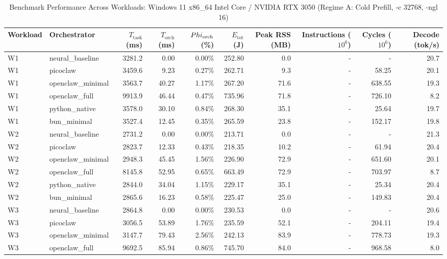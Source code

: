 \begin{table}[t]
\centering\small
\caption{Benchmark Performance Across Workloads: Windows 11 x86_64 Intel Core / NVIDIA RTX 3050 (Regime A: Cold Prefill, -c 32768, -ngl 16)}
\label{tab:Windows_master_summary}
\begin{tabular}{llrrrrrrrr}
\toprule
Workload & Orchestrator & $T_{\text{task}}$ (ms) & $T_{\text{orch}}$ (ms) & $\\Phi_{\text{orch}}$ (\%) & $E_{\text{tot}}$ (J) & Peak RSS (MB) & Instructions ($10^6$) & Cycles ($10^6$) & Decode (tok/s) \\
\midrule
W1 & neural\_baseline & 3281.2 & 0.00 & 0.00\% & 252.80 & 0.0 & - & - & 20.7 \\
W1 & picoclaw & 3459.6 & 9.23 & 0.27\% & 262.71 & 9.3 & - & 58.25 & 20.1 \\
W1 & openclaw\_minimal & 3563.7 & 40.27 & 1.17\% & 267.20 & 71.6 & - & 638.55 & 19.3 \\
W1 & openclaw\_full & 9913.9 & 46.44 & 0.47\% & 735.96 & 71.8 & - & 726.10 & 8.2 \\
W1 & python\_native & 3578.0 & 30.10 & 0.84\% & 268.30 & 35.1 & - & 25.64 & 19.7 \\
W1 & bun\_minimal & 3527.4 & 12.45 & 0.35\% & 265.59 & 23.8 & - & 152.17 & 19.8 \\
\midrule
W2 & neural\_baseline & 2731.2 & 0.00 & 0.00\% & 213.71 & 0.0 & - & - & 21.3 \\
W2 & picoclaw & 2823.7 & 12.33 & 0.43\% & 218.35 & 10.2 & - & 61.94 & 20.4 \\
W2 & openclaw\_minimal & 2948.3 & 45.45 & 1.56\% & 226.90 & 72.9 & - & 651.60 & 20.1 \\
W2 & openclaw\_full & 8145.8 & 52.95 & 0.65\% & 663.49 & 72.9 & - & 703.97 & 8.7 \\
W2 & python\_native & 2844.0 & 34.04 & 1.15\% & 229.17 & 35.1 & - & 25.34 & 20.4 \\
W2 & bun\_minimal & 2865.6 & 16.23 & 0.58\% & 225.47 & 25.0 & - & 149.83 & 20.4 \\
\midrule
W3 & neural\_baseline & 2864.8 & 0.00 & 0.00\% & 230.53 & 0.0 & - & - & 20.6 \\
W3 & picoclaw & 3056.5 & 53.89 & 1.76\% & 235.59 & 52.1 & - & 204.11 & 19.4 \\
W3 & openclaw\_minimal & 3147.7 & 79.43 & 2.56\% & 242.13 & 83.9 & - & 778.73 & 19.3 \\
W3 & openclaw\_full & 9692.5 & 85.94 & 0.86\% & 745.70 & 84.0 & - & 968.58 & 8.0 \\

\end{tabular}
\end{table}
